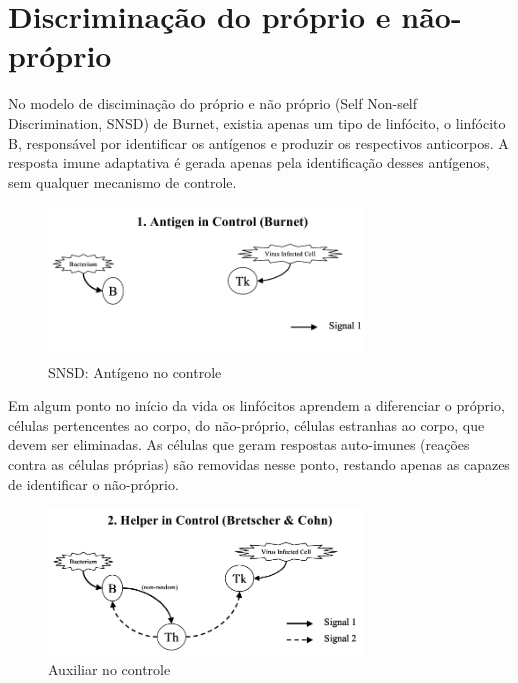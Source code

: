 \section{Discriminação do próprio e não-próprio}

No modelo de disciminação do próprio e não próprio (Self Non-self Discrimination, SNSD) de Burnet, existia apenas um tipo de linfócito, o linfócito B, responsável por identificar os antígenos e produzir os respectivos anticorpos. A resposta imune adaptativa é gerada apenas pela identificação desses antígenos, sem qualquer mecanismo de controle.

\begin{figure}[h!]
\centering
\includegraphics[width=0.75\textwidth]{img/signals1-antigen.png}
\caption{SNSD: Antígeno no controle \cite{Aickelin2002}}
\label{img:signals-first}
\end{figure}

Em algum ponto no início da vida os linfócitos aprendem a diferenciar o próprio, células pertencentes ao corpo, do não-próprio, células estranhas ao corpo, que devem ser eliminadas. As células que geram respostas auto-imunes (reações contra as células próprias) são removidas nesse ponto, restando apenas as capazes de identificar o não-próprio.

\begin{figure}[h!]
\centering
\includegraphics[width=0.75\textwidth]{img/signals2-helper.png}
\caption{Auxiliar no controle \cite{Aickelin2002}}
\label{fig:nis_helper}
\end{figure}

